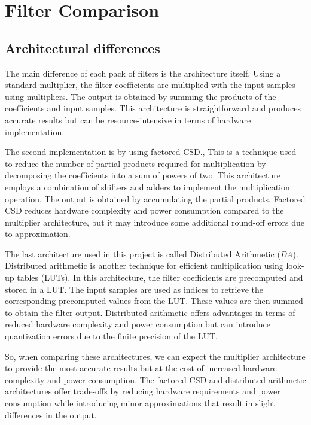 
\section{Filter Comparison}

\subsection{Architectural differences}
\label{sec:filter_comp_subsec:architectural_diff}
The main difference of each pack of filters is the architecture itself.
Using a standard multiplier, the filter coefficients are multiplied with the input samples using multipliers. The output is obtained by summing the products of the coefficients and input samples. This architecture is straightforward and produces accurate results but can be resource-intensive in terms of hardware implementation.

The second implementation is by using factored CSD., This is a technique used to reduce the number of partial products required for multiplication by decomposing the coefficients into a sum of powers of two. This architecture employs a combination of shifters and adders to implement the multiplication operation. The output is obtained by accumulating the partial products. Factored CSD reduces hardware complexity and power consumption compared to the multiplier architecture, but it may introduce some additional round-off errors due to approximation.

The last architecture used in this project is called Distributed Arithmetic (\emph{DA}).
Distributed arithmetic is another technique for efficient multiplication using look-up tables (LUTs). In this architecture, the filter coefficients are precomputed and stored in a LUT. The input samples are used as indices to retrieve the corresponding precomputed values from the LUT. These values are then summed to obtain the filter output. Distributed arithmetic offers advantages in terms of reduced hardware complexity and power consumption but can introduce quantization errors due to the finite precision of the LUT.

So, when comparing these architectures, we can expect the multiplier architecture to provide the most accurate results but at the cost of increased hardware complexity and power consumption.
The factored CSD and distributed arithmetic architectures offer trade-offs by reducing hardware requirements and power consumption while introducing minor approximations that result in slight differences in the output.

